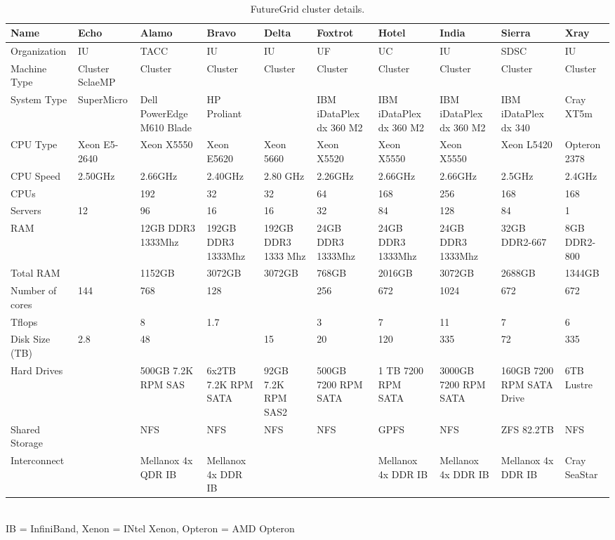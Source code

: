 \begin{sidewaystable}

\caption{FutureGrid cluster details.}\label{F:cluster-details}
~\\
\begin{footnotesize}
\begin{tabular}{|p{2cm}||p{4cm}p{1.5cm}p{1.5cm}p{1.5cm}p{1.5cm}p{1.5cm}p{1.5cm}p{1.5cm}p{1cm}|}
\hline
 \bf Name                                & \bf Echo & \bf Alamo & \bf Bravo & \bf Delta & \bf Foxtrot & \bf Hotel & \bf India & \bf Sierra & \bf Xray \\
\hline
\hline
 Organization                        & IU & TACC & IU & IU & UF & UC & IU & SDSC & IU \\
\hline
 Machine Type                        & Cluster SclaeMP & Cluster & Cluster & Cluster & Cluster & Cluster & Cluster & Cluster & Cluster \\
\hline
 System Type                         &SuperMicro& Dell PowerEdge M610 Blade & HP Proliant && IBM iDataPlex dx 360 M2 & IBM iDataPlex dx 360 M2 & IBM iDataPlex dx 360 M2 & IBM iDataPlex dx 340 & Cray XT5m \\
\hline
 CPU Type                            & Xeon E5-2640 &  Xeon X5550 &  Xeon E5620 &  Xeon 5660 &  Xeon X5520 &  Xeon X5550 &  Xeon X5550 &  Xeon L5420 & Opteron 2378 \\
\hline
 CPU Speed                           &2.50GHz& 2.66GHz & 2.40GHz & 2.80 GHz & 2.26GHz & 2.66GHz & 2.66GHz & 2.5GHz & 2.4GHz \\
\hline
 CPUs                                &&192&32&32&64&168&256&168&168 \\
\hline
 Servers                             &12&96&16&16&32&84&128&84&1 \\
\hline
 RAM                                 && 12GB DDR3 1333Mhz & 192GB DDR3 1333Mhz & 192GB DDR3 1333 Mhz & 24GB DDR3 1333Mhz & 24GB DDR3 1333Mhz & 24GB DDR3 1333Mhz & 32GB DDR2-667 & 8GB DDR2-800 \\
\hline
 Total RAM                           &&1152GB&3072GB&3072GB&768GB&2016GB&3072GB&2688GB&1344GB \\
\hline
 Number of cores                     &144&768&128&&256&672&1024&672&672 \\
\hline
 Tflops                              &&8&1.7&&3&7&11&7&6 \\
\hline
 Disk Size (TB)                      &2.8&48&&15&20&120&335&72&335 \\
\hline
 Hard Drives                         && 500GB 7.2K RPM SAS & 6x2TB 7.2K RPM SATA & 92GB 7.2K RPM SAS2 & 500GB 7200 RPM SATA & 1 TB 7200 RPM SATA & 3000GB 7200 RPM SATA & 160GB 7200 RPM SATA Drive & 6TB Lustre \\
\hline
 Shared Storage                      && NFS & NFS &NFS& NFS & GPFS & NFS & ZFS 82.2TB & NFS \\
\hline
 Interconnect                        && Mellanox 4x QDR IB & Mellanox 4x DDR IB &&& Mellanox 4x DDR IB & Mellanox 4x DDR IB & Mellanox 4x DDR IB & Cray SeaStar \\
\hline
\end{tabular}
~\\
IB = InfiniBand, Xenon = INtel Xenon, Opteron = AMD Opteron 


\end{footnotesize}
\end{sidewaystable}
